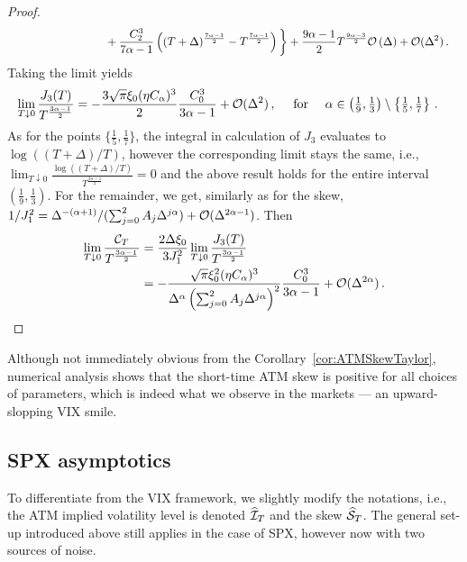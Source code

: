 \begin{proof}
\begin{align*}
    & \hspace{3cm} + \frac{C_2^3}{7\alpha-1} \left( (T+\Delta)^{\frac{7\alpha - 1}{2}} - T^{\frac{7\alpha - 1}{2}} \right) \bigg\} + \frac{9\alpha - 1}{2}T^{\frac{9\alpha - 3}{2}}\Oo\left(\Delta\right) + \Oo(\Delta^2)\,.
\end{align*}
Taking the limit yields
\begin{align*}
    \lim _{T \downarrow 0} \frac{J_3(T)}{T^{\frac{3\alpha-1}{2}}} &= - \frac{3\sqrt{\pi}\xi_0(\eta C_{\alpha})^3}{2} \frac{C_0^3}{3\alpha-1} + \mathcal{O}(\Delta^2)\,, \quad \textup{ for } \quad \textstyle \alpha\in\left(\frac{1}{9}, \frac{1}{3}\right)\setminus\left\{\frac15, \frac17\right\}\,.
\end{align*}
As for the points $\{\frac15, \frac17\}$, the integral in calculation of $J_3$ evaluates to $\log((T+\Delta)/T)$, however the corresponding limit stays the same, i.e., $\lim_{T\downarrow 0}\frac{\log((T+\Delta)/T)}{T^{\frac{3\alpha-1}{2}}}=0$ and the above result holds for the entire interval $(\frac19,\frac13)$. For the remainder, we get, similarly as for the skew, $1/J_1^2=\Delta^{-(\alpha+1)}/(\sum_{j=0}^2 A_j \Delta^{j\alpha}) + \mathcal{O}(\Delta^{2\alpha-1})$. Then
\begin{align*}
    \lim _{T \downarrow 0} \frac{\mathcal{C}_T}{T^{\frac{3\alpha-1}{2}}} &= \frac{2 \Delta \xi_0}{3J_1^2} \lim _{T \downarrow 0} \frac{J_3(T)}{T^{\frac{3\alpha-1}{2}}} \\
    &= - \frac{\sqrt{\pi}\xi_0^2(\eta C_{\alpha})^3}{\Delta^{\alpha}\left(\sum_{j=0}^2 A_j \Delta^{j\alpha}\right)^2} \frac{C_0^3}{3\alpha-1} + \mathcal{O}(\Delta^{2\alpha})\,.
\end{align*}

\end{proof}
Although not immediately obvious from the Corollary~\ref{cor:ATMSkewTaylor}, numerical analysis shows that the short-time ATM skew is positive for all choices of parameters, which is indeed what we observe in the markets --- an upward-slopping VIX smile.
\subsection{SPX asymptotics}\label{sec:SPX_asymptotics}
To differentiate from the VIX framework, we slightly modify the notations, i.e., the ATM implied volatility level is denoted $\widehat {\mathcal{I}}_T$ and the skew $\widehat{\mathcal{S}}_T$. The general set-up introduced above still applies in the case of SPX, however now with two sources of noise.

